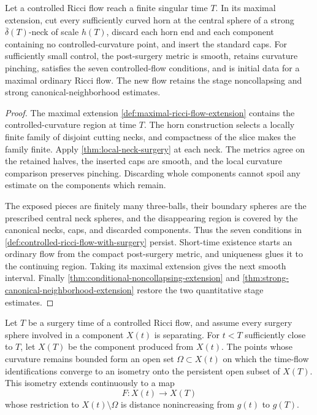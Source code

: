 \begin{lemma}
\label{lem:controlled-surgery-restart}
\notready
Let a controlled Ricci flow reach a finite singular time $T$.  In its maximal
extension, cut every sufficiently curved horn at the central sphere of a
strong $\bar\delta(T)$-neck of scale $h(T)$, discard each horn end and each
component containing no controlled-curvature point, and insert the standard
caps.  For sufficiently small control, the post-surgery metric is smooth,
retains curvature pinching, satisfies the seven controlled-flow conditions,
and is initial data for a maximal ordinary Ricci flow.  The new flow retains
the stage noncollapsing and strong canonical-neighborhood estimates.
\end{lemma}

\begin{proof}
The maximal extension \ref{def:maximal-ricci-flow-extension} contains the
controlled-curvature region at time $T$.  The horn construction selects a
locally finite family of disjoint cutting necks, and compactness of the slice
makes the family finite.  Apply \ref{thm:local-neck-surgery} at each neck.
The metrics agree on the retained halves, the inserted caps are smooth, and
the local curvature comparison preserves pinching.  Discarding whole
components cannot spoil any estimate on the components which remain.

The exposed pieces are finitely many three-balls, their boundary spheres are
the prescribed central neck spheres, and the disappearing region is covered
by the canonical necks, caps, and discarded components.  Thus the seven
conditions in \ref{def:controlled-ricci-flow-with-surgery} persist.  Short-time
existence starts an ordinary flow from the compact post-surgery metric, and
uniqueness glues it to the continuing region.  Taking its maximal extension
gives the next smooth interval.  Finally
\ref{thm:conditional-noncollapsing-extension} and
\ref{thm:strong-canonical-neighborhood-extension} restore the two quantitative
stage estimates.
\end{proof}

\begin{theorem}
\label{thm:separating-surgery-map}
\notready
Let $T$ be a surgery time of a controlled Ricci flow, and assume every
surgery sphere involved in a component $X(t)$ is separating.  For $t<T$
sufficiently close to $T$, let $X(T)$ be the component produced from
$X(t)$.  The points whose curvature remains bounded form an open set
$\Omega\subset X(t)$ on which the time-flow identifications converge to an
isometry onto the persistent open subset of $X(T)$.  This isometry extends
continuously to a map
\[
 F\colon X(t)\longrightarrow X(T)
\]
whose restriction to $X(t)\setminus\Omega$ is distance nonincreasing from
$g(t)$ to $g(T)$.
\end{theorem}

